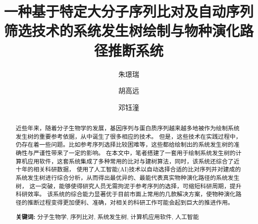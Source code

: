 \documentclass{article}
\begin{document}
\title{一种基于特定大分子序列比对及自动序列筛选技术的系统发生树绘制与物种演化路径推断系统}
\author[1,*]{朱璟瑞}
\author[2]{胡高远}
\author[3]{邓钰潼}
\date{}
\maketitle

\begin{abstract}
    \par
    近些年来，随着分子生物学的发展，基因序列与蛋白质序列越来越多地被作为绘制系统发生树的重要参考依据，从中诞生了很多相应的技术。
    但是，这些技术在实践过程中，仍存在着一些问题。比如参考序列选择比较困难等，这些都给绘制出的系统发生树的准确性与严谨性带来了一定的影响。
    在本文中，笔者搭建了一套用于绘制系统发生树的计算机应用软件，这套系统集成了多种常用的比对与建树算法，同时，该系统还综合了近十年的相关科研数据，
    使用了人工智能(AI)技术以自动选择合适的比对序列并对建成的系统发生树进行综合分析，从而得出最优异的、最能代表真实物种演化路径的系统发生树，
    这一突破，能够使得研究人员无需拘泥于参考序列的选择，可缩短科研周期，提升科研效率。
    该系统的综合能力显著优于目前市面上常用的几款解决方案，使物种演化路径的推断过程变得更加便利、准确，对相关的科研工作可能会起到巨大的推进作用。
    \par\textbf{关键词: } 分子生物学, 序列比对, 系统发生树, 计算机应用软件, 人工智能
\end{abstract}

\tableofcontents
\newpage
{}
\end{document}
